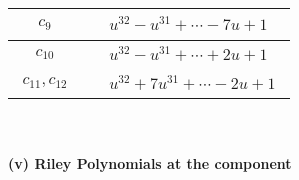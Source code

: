 \documentclass[1p]{elsarticle_modified}
\theoremstyle{definition}
\begin{document}
\begin{tabular}{m{50pt}|m{274pt}}
\hline $$\begin{aligned}c_{9}\end{aligned}$$&$\begin{aligned}
&u^{32}- u^{31}+\cdots-7 u+1
\end{aligned}$\\
\hline $$\begin{aligned}c_{10}\end{aligned}$$&$\begin{aligned}
&u^{32}- u^{31}+\cdots+2 u+1
\end{aligned}$\\
\hline $$\begin{aligned}c_{11},c_{12}\end{aligned}$$&$\begin{aligned}
&u^{32}+7 u^{31}+\cdots-2 u+1
\end{aligned}$\\
\hline
\end{tabular}\\~\\
\newpage\renewcommand{\arraystretch}{1}
\flushleft \textbf{(v) Riley Polynomials at the component}\newline \\
\end{document}
